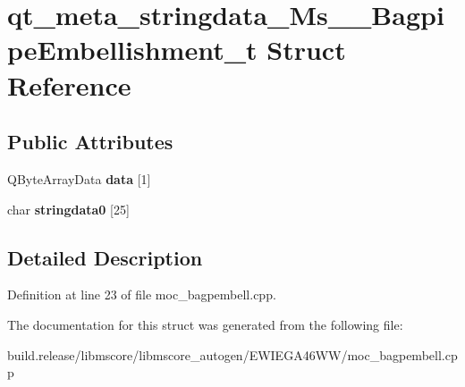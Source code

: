 \hypertarget{structqt__meta__stringdata___ms_____bagpipe_embellishment__t}{}\section{qt\+\_\+meta\+\_\+stringdata\+\_\+\+Ms\+\_\+\+\_\+\+Bagpipe\+Embellishment\+\_\+t Struct Reference}
\label{structqt__meta__stringdata___ms_____bagpipe_embellishment__t}
\subsection*{Public Attributes}
\begin{DoxyCompactItemize}
\item 
\mbox{\label{structqt__meta__stringdata___ms_____bagpipe_embellishment__t_a145b3a4581b738c14bcb084e80fa3ce8}} 
Q\+Byte\+Array\+Data {\bfseries data} \mbox{[}1\mbox{]}
\item 
\mbox{\label{structqt__meta__stringdata___ms_____bagpipe_embellishment__t_a5a8119321107465988e850224d7b6f97}} 
char {\bfseries stringdata0} \mbox{[}25\mbox{]}
\end{DoxyCompactItemize}


\subsection{Detailed Description}


Definition at line 23 of file moc\+\_\+bagpembell.\+cpp.



The documentation for this struct was generated from the following file\+:\begin{DoxyCompactItemize}
\item 
build.\+release/libmscore/libmscore\+\_\+autogen/\+E\+W\+I\+E\+G\+A46\+W\+W/moc\+\_\+bagpembell.\+cpp\end{DoxyCompactItemize}
